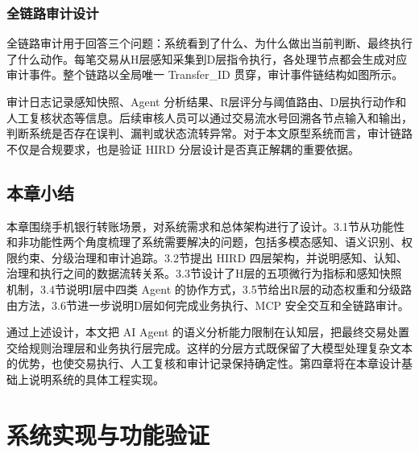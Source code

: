 \documentclass{xduugthesis}
\begin{document}

\subsection{全链路审计设计}
全链路审计用于回答三个问题：系统看到了什么、为什么做出当前判断、最终执行了什么动作。每笔交易从H层感知采集到D层指令执行，各处理节点都会生成对应审计事件。整个链路以全局唯一 Transfer\_ID 贯穿，审计事件链结构如图所示。



审计日志记录感知快照、Agent 分析结果、R层评分与阈值路由、D层执行动作和人工复核状态等信息。后续审核人员可以通过交易流水号回溯各节点输入和输出，判断系统是否存在误判、漏判或状态流转异常。对于本文原型系统而言，审计链路不仅是合规要求，也是验证 HIRD 分层设计是否真正解耦的重要依据。

\section{本章小结}

本章围绕手机银行转账场景，对系统需求和总体架构进行了设计。3.1节从功能性和非功能性两个角度梳理了系统需要解决的问题，包括多模态感知、语义识别、权限约束、分级治理和审计追踪。3.2节提出 HIRD 四层架构，并说明感知、认知、治理和执行之间的数据流转关系。3.3节设计了H层的五项微行为指标和感知快照机制，3.4节说明I层中四类 Agent 的协作方式，3.5节给出R层的动态权重和分级路由方法，3.6节进一步说明D层如何完成业务执行、MCP 安全交互和全链路审计。

通过上述设计，本文把 AI Agent 的语义分析能力限制在认知层，把最终交易处置交给规则治理层和业务执行层完成。这样的分层方式既保留了大模型处理复杂文本的优势，也使交易执行、人工复核和审计记录保持确定性。第四章将在本章设计基础上说明系统的具体工程实现。

\chapter{系统实现与功能验证}
\end{document}

